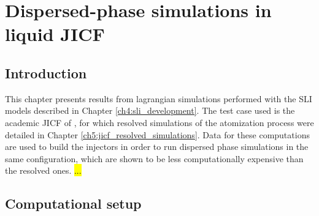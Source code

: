 \chapter{Dispersed-phase simulations in liquid JICF}
	\label{ch6:jicf_lgs_simulations}


%
%
%	
%	
%	
%	
%


\section{Introduction}

This chapter presents results from lagrangian simulations performed with the SLI models described in Chapter \ref{ch4:sli_development}. The test case used is the academic JICF of , for which resolved simulations of the atomization process were detailed in Chapter \ref{ch5:jicf_resolved_simulations}. Data for these computations are used to build the injectors in order to run dispersed phase simulations in the same configuration, which are shown to be less computationally expensive than the resolved ones. \hl{...}


\section{Computational setup}

